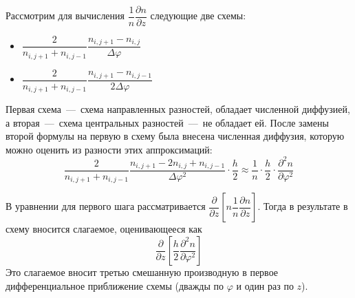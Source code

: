 \documentclass[2pt, a4paper, fleqn]{extarticle}
\begin{document}
Рассмотрим для вычисления $\dfrac{1}{n} \dfrac{\partial n}{\partial z}$ следующие две схемы:

\begin{itemize}
\item $\dfrac{2}{n_{i, j+1}+n_{i, j-1}}\dfrac{n_{i, j+1}-n_{i, j}}{\Delta\varphi}$
\item $\dfrac{2}{n_{i, j+1}+n_{i, j-1}}\dfrac{n_{i, j+1}-n_{i, j-1}}{2\Delta\varphi}$
\end{itemize}

Первая схема~---~схема направленных разностей, обладает численной диффузией, а вторая~---~схема центральных разностей~---~не обладает ей. После замены второй формулы на первую в схему была внесена численная диффузия, которую можно оценить из разности этих аппроксимаций: $$\dfrac{2}{n_{i, j+1}+n_{i, j-1}}\dfrac{n_{i, j+1}-2n_{i, j}+n_{i, j-1}}{\Delta\varphi^2} \cdot\dfrac{h}{2} \approx\dfrac{1}{n} \cdot \dfrac{h}{2}\cdot \dfrac{\partial^2 n}{\partial \varphi^2}$$

В уравнении для первого шага рассматривается $\dfrac{\partial}{\partial z}\left[n \dfrac{1}{n} \dfrac{\partial n}{\partial z}\right]$. Тогда в результате в схему вносится слагаемое, оценивающееся как $$\dfrac{\partial}{\partial z}\left[\dfrac{h}{2}\dfrac{\partial^2 n}{\partial \varphi^2}\right]$$
Это слагаемое вносит третью смешанную производную в первое дифференциальное приближение схемы (дважды по $\varphi$ и один раз по $z$).
\end{document}
